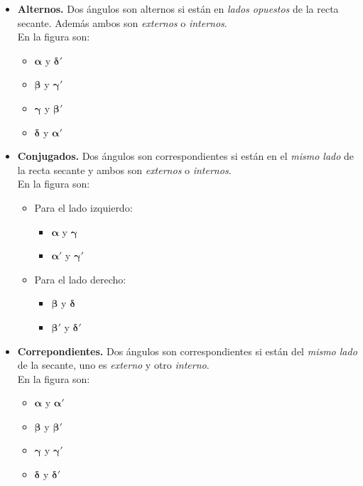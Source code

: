 \begin{itemize}
  \item \textbf{Alternos.} Dos ángulos son alternos si están en 
    \textit{lados opuestos} de la recta secante. Además ambos son 
    \textit{externos} o \textit{internos}.\\
    En la figura son:
    \begin{itemize}
      \item $\pmb{\alpha}$ y $\pmb{\delta'}$
      \item $\pmb{\beta}$ y $\pmb{\gamma'}$
      \item $\pmb{\gamma}$ y $\pmb{\beta'}$
      \item $\pmb{\delta}$ y $\pmb{\alpha'}$
    \end{itemize}
  \item \textbf{Conjugados.} Dos ángulos son correspondientes si están en el 
    \textit{mismo lado} de la recta secante y ambos son \textit{externos} o
    \textit{internos}.\\
    En la figura son:
    \begin{itemize}
      \item Para el lado izquierdo:
      \begin{itemize}
        \item $\pmb{\alpha}$ y $\pmb{\gamma}$
        \item $\pmb{\alpha'}$ y $\pmb{\gamma'}$
      \end{itemize}
      \item Para el lado derecho:
      \begin{itemize}
        \item $\pmb{\beta}$ y $\pmb{\delta}$
        \item $\pmb{\beta'}$ y $\pmb{\delta'}$
      \end{itemize}
    \end{itemize}
  \item \textbf{Correpondientes.} Dos ángulos son correspondientes si están del
    \textit{mismo lado} de la secante, uno es \textit{externo} y otro 
    \textit{interno}.\\
    En la figura son: 
    \begin{itemize}
      \item $\pmb{\alpha}$ y $\pmb{\alpha'}$
      \item $\pmb{\beta}$ y $\pmb{\beta'}$
      \item $\pmb{\gamma}$ y $\pmb{\gamma'}$
      \item $\pmb{\delta}$ y $\pmb{\delta'}$
    \end{itemize}
\end{itemize}

